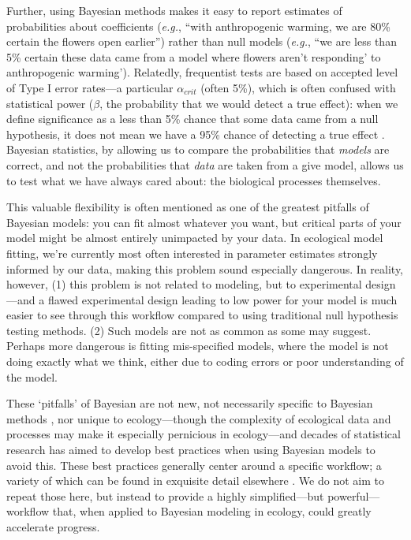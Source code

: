 \documentclass[11pt]{article}
\begin{document}
{%
Further, using Bayesian methods makes it easy to report estimates of probabilities about coefficients (\emph{e.g.}, ``with anthropogenic warming, we are 80\% certain the flowers open earlier'') rather than null models (\emph{e.g.}, ``we are less than 5\% certain these data came from a model where flowers aren't responding' to anthropogenic warming'). Relatedly, frequentist tests are based on accepted level of Type I error rates---a particular $\alpha_{crit}$ (often 5\%), which is often confused with statistical power ($\beta$, the probability that we would detect a true effect): when we define significance as a less than 5\% chance that some data came from a null hypothesis, it does not mean we have a 95\% chance of detecting a true effect \citep[indeed statistical power is often extremely low in ecological studies,][]{jennions2003survey}. Bayesian statistics, by allowing us to compare the probabilities that \emph{models} are correct, and not the probabilities that \emph{data} are taken from a give model, allows us to test what we have always cared about: the biological processes themselves.

This valuable flexibility is often mentioned as one of the greatest pitfalls of Bayesian models: you can fit almost whatever you want, but critical parts of your model might be almost entirely unimpacted by your data. In ecological model fitting, we're currently most often interested in parameter estimates strongly informed by our data, making this problem sound especially dangerous. In reality, however, (1) this problem is not related to modeling, but to experimental design---and a flawed experimental design leading to low power for your model is much easier to see through this workflow compared to using traditional null hypothesis testing methods. (2) Such models are not as common as some may suggest. Perhaps more dangerous is fitting mis-specified models, where the model is not doing exactly what we think, either due to coding errors or poor understanding of the model. 

These `pitfalls' of Bayesian are not new, not necessarily specific to Bayesian methods \citep{low2014rising}, nor unique to ecology---though the complexity of ecological data and processes may make it especially pernicious in ecology---and decades of statistical research has aimed to develop best practices when using Bayesian models to avoid this. These best practices generally center around a specific workflow; a variety of which can be found in exquisite detail elsewhere \citep{betanworkflow,grinsztajn2021,vandeschoot2021}. We do not aim to repeat those here, but instead to provide a highly simplified---but powerful---workflow that, when applied to Bayesian modeling in ecology, could greatly accelerate progress. %

}
\end{document}
